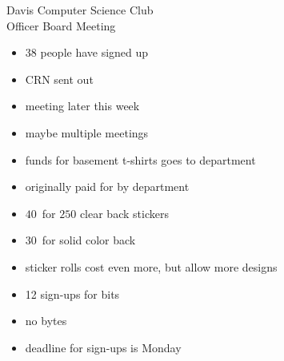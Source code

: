 \documentclass{article}
\begin{document}
\begin{Minutes}{Davis Computer Science Club\\Officer Board Meeting}




\maketitle
{}
\begin{itemize}
\item 38 people have signed up
\item CRN sent out
\item meeting later this week
\item maybe multiple meetings
\end{itemize}

\begin{itemize}
\item funds for basement t-shirts goes to department
\item originally paid for by department
\end{itemize}
\begin{itemize}
\item $40$\textcent\ for $250$ clear back stickers
\item $30$\textcent\ for solid color back
\item sticker rolls cost even more, but allow more designs
\end{itemize}

\begin{itemize}
\item 12 sign-ups for bits
\item no bytes
\item deadline for sign-ups is Monday
\end{itemize}


\end{Minutes}
\end{document}
